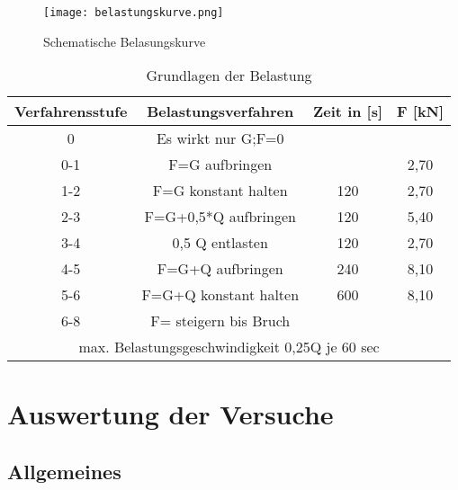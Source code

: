 \documentclass[12 pt,a4 paper ]{scrreprt}
\begin{document}
\begin{figure}
\begin{center}

	\texttt{[image: belastungskurve.png]}
	\caption{Schematische Belasungskurve}
	\label{belastungskurve}

\end{center}	
\end{figure}	

\begin{table}
\caption{Grundlagen der Belastung}
\begin{center}
\begin{tabular}{|c|c|c|c|}
\hline 
Verfahrensstufe & Belastungsverfahren & Zeit in [s] & F [kN] \\ 
\hline \hline
0 & Es wirkt nur G;F=0 &  &  \\ 
\hline 
0-1 & F=G aufbringen &  & 2,70 \\ 
\hline 
1-2 & F=G konstant halten & 120 & 2,70 \\ 
\hline 
2-3 & F=G+0,5*Q aufbringen & 120 & 5,40 \\ 
\hline 
3-4 & 0,5 Q entlasten & 120 & 2,70 \\ 
\hline 
4-5 & F=G+Q aufbringen & 240 & 8,10 \\ 
\hline 
5-6 & F=G+Q konstant halten & 600 & 8,10 \\ 
\hline 
6-8 & F= steigern bis Bruch &  &  \\ 
\hline \hline
\multicolumn{4}{|c|}{ max. Belastungsgeschwindigkeit 0,25Q je 60 sec} \\ 
\hline 
\end{tabular} 
\label{tab:belastung}
\end{center}
\end{table}

















	
	
	
	
	
	
	
\chapter{Auswertung der Versuche}

\section{Allgemeines}
\end{document}
